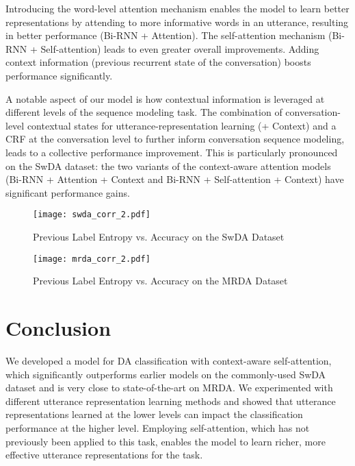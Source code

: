 \documentclass[11pt,a4paper]{article}
\begin{document}
Introducing the word-level attention mechanism \cite{yang2016hierarchical} enables the model to learn better representations by attending to more informative words in an utterance, resulting in better performance (Bi-RNN + Attention). The self-attention mechanism (Bi-RNN + Self-attention) leads to even greater overall improvements.  Adding context information (previous recurrent state of the conversation) boosts performance significantly. 



A notable aspect of our model is how contextual information is leveraged at different levels of the sequence modeling task.  The combination of conversation-level contextual states for utterance-representation learning (+ Context) and a CRF at the conversation level to further inform conversation sequence modeling, leads to a collective performance improvement. 
This is particularly pronounced on the SwDA dataset: the two variants of the context-aware attention models (Bi-RNN + Attention + Context and Bi-RNN + Self-attention + Context) have significant performance gains.



\begin{figure}
\centering
    \def\svgwidth{\columnwidth}
    \texttt{[image: swda\_corr\_2.pdf]}
    \caption{\label{figure2} Previous Label Entropy vs. Accuracy on the SwDA Dataset}
\end{figure}

\begin{figure}
    \centering
    \def\svgwidth{\columnwidth}
    \texttt{[image: mrda\_corr\_2.pdf]}
    \caption{\label{figure3} Previous Label Entropy vs. Accuracy on the MRDA Dataset}
\end{figure}





\section{Conclusion}
We developed a model for DA classification with context-aware self-attention, which significantly outperforms earlier models on the commonly-used SwDA dataset and is very close to state-of-the-art on MRDA.
We experimented with different utterance representation learning methods and showed that utterance representations learned at the lower levels can impact the classification performance at the higher level. Employing self-attention, which has not previously been applied to this task, enables the model to learn richer, more effective utterance representations for the task. 
\end{document}
